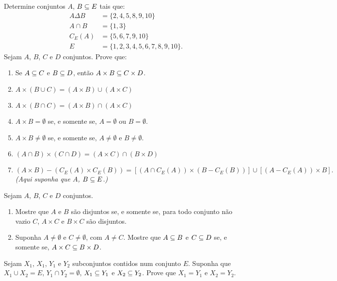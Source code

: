 \documentclass[12pt]{exam}
\begin{document}
\questao{} Determine conjuntos $A$, $B \subseteq E$ tais que:
\begin{align*}
    A \Delta B &= \{2, 4, 5, 8, 9, 10\}\\
    A \cap B &= \{1, 3\}\\
    C_E(A) &= \{5, 6, 7, 9, 10\}\\
    E &= \{1, 2, 3, 4, 5, 6, 7, 8, 9, 10\}.
\end{align*}
\questao{} Sejam $A$, $B$, $C$ e $D$ conjuntos. Prove que:
\begin{enumerate}[label={\alph*})]
    \item Se $A \subseteq C$ e $B \subseteq D$, ent\~ao $A \times B \subseteq C \times D$.

    \item $A \times (B \cup C) = (A \times B) \cup (A \times C)$

    \item $A \times (B \cap C) = (A \times B) \cap (A \times C)$

    \item $A \times B = \emptyset$ se, e somente se, $A = \emptyset$ ou $B = \emptyset$.

    \item $A \times B \ne \emptyset$ se, e somente se, $A \ne \emptyset$ e $B \ne \emptyset$.

    \item $(A \cap B) \times (C \cap D) = (A \times C) \cap (B \times D)$

    \item $(A \times B) - (C_E(A) \times C_E(B)) = [(A \cap C_E(A)) \times (B - C_E(B))] \cup [(A - C_E(A)) \times B].$  \textit{(Aqui suponha que $A$, $B \subseteq E$.)}
\end{enumerate}

\questao{} Sejam $A$, $B$, $C$ e $D$ conjuntos.
\begin{enumerate}[label={\alph*})]
    \item Mostre que $A$ e $B$ s\~ao disjuntos se, e somente se, para todo conjunto n\~ao vazio $C$, $A \times C$ e $B \times C$ s\~ao disjuntos.
    \item Suponha $A \ne \emptyset$ e $C \ne \emptyset$, com $A \ne C$. Mostre que $A \subseteq B$ e $C \subseteq D$ se, e somente se, $A \times C \subseteq B \times D$.
\end{enumerate}

\vspace{.3cm}

\questao{} Sejam $X_1$, $X_1$, $Y_1$ e $Y_2$ subconjuntos contidos num conjunto $E$. Suponha que $X_1 \cup X_2 = E$, $Y_1 \cap Y_2 = \emptyset$, $X_1 \subseteq Y_1$ e $X_2 \subseteq Y_2$. Prove que $X_1 = Y_1$ e $X_2 = Y_2$.
\end{document}
